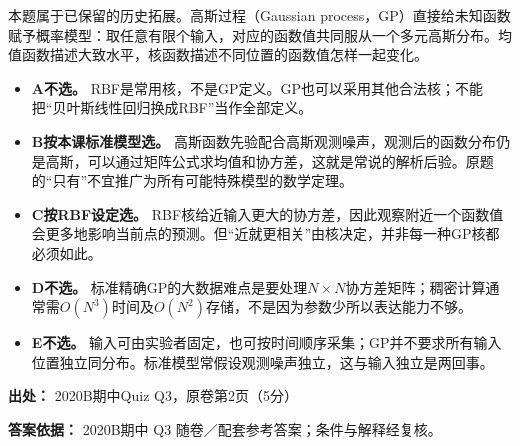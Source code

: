 本题属于已保留的历史拓展。高斯过程（Gaussian process，GP）直接给未知函数赋予概率模型：取任意有限个输入，对应的函数值共同服从一个多元高斯分布。均值函数描述大致水平，核函数描述不同位置的函数值怎样一起变化。



\begin{itemize}

\item \textbf{A不选。} RBF是常用核，不是GP定义。GP也可以采用其他合法核；不能把“贝叶斯线性回归换成RBF”当作全部定义。

\item \textbf{B按本课标准模型选。} 高斯函数先验配合高斯观测噪声，观测后的函数分布仍是高斯，可以通过矩阵公式求均值和协方差，这就是常说的解析后验。原题的“只有”不宜推广为所有可能特殊模型的数学定理。

\item \textbf{C按RBF设定选。} RBF核给近输入更大的协方差，因此观察附近一个函数值会更多地影响当前点的预测。但“近就更相关”由核决定，并非每一种GP核都必须如此。

\item \textbf{D不选。} 标准精确GP的大数据难点是要处理\(N\times N\)协方差矩阵；稠密计算通常需\(O(N^3)\)时间及\(O(N^2)\)存储，不是因为参数少所以表达能力不够。

\item \textbf{E不选。} 输入可由实验者固定，也可按时间顺序采集；GP并不要求所有输入位置独立同分布。标准模型常假设观测噪声独立，这与输入独立是两回事。

\end{itemize}


\textbf{出处：} 2020B期中Quiz Q3，原卷第2页（5分）


\textbf{答案依据：} 2020B期中 Q3 随卷／配套参考答案；条件与解释经复核。
